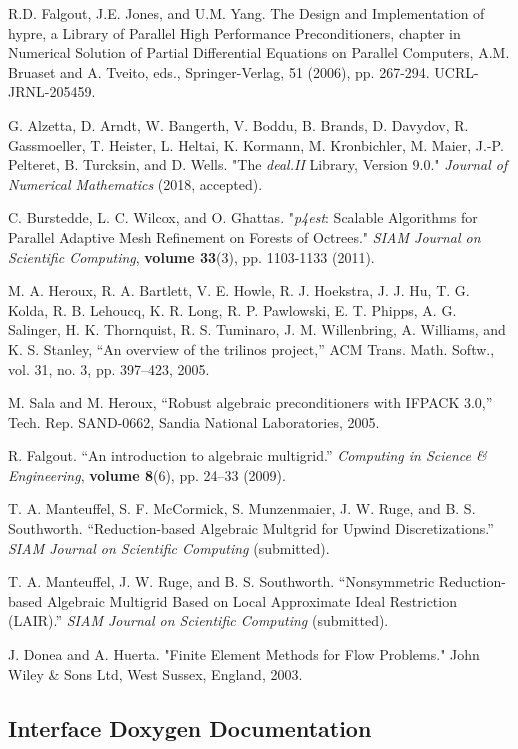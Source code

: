 \documentclass[11pt]{article}
\begin{document}
\FloatBarrier
\newpage
\begin{thebibliography}{9}

	R.D. Falgout, J.E. Jones, and U.M. Yang. 
	The Design and Implementation of hypre, a Library of Parallel High Performance Preconditioners, chapter in Numerical Solution of Partial Differential Equations on Parallel Computers, A.M. Bruaset and A. Tveito, eds., Springer-Verlag, 51 (2006), pp. 267-294. UCRL-JRNL-205459.
	
	G. Alzetta, D. Arndt, W. Bangerth, V. Boddu, B. Brands, D. Davydov, R. Gassmoeller, T. Heister, L. Heltai, K. Kormann, M. Kronbichler, M. Maier, J.-P. Pelteret, B. Turcksin, and D. Wells. "The \textit{deal.II} Library, Version 9.0." \textit{Journal of Numerical Mathematics} (2018, accepted).	
	
	C. Burstedde, L. C. Wilcox, and O. Ghattas. 
    "\textit{p4est}: Scalable Algorithms for Parallel Adaptive Mesh Refinement on Forests of Octrees." \textit{SIAM Journal on Scientific Computing}, \textbf{volume 33}(3), pp. 1103-1133 (2011).
    
	M. A. Heroux, R. A. Bartlett, V. E. Howle, R. J. Hoekstra, J. J. Hu, T. G. Kolda, R. B. Lehoucq, K. R. Long, R. P. Pawlowski, E. T. Phipps, A. G. Salinger, H. K. Thornquist, R. S. Tuminaro, J. M. Willenbring, A. Williams, and K. S. Stanley, “An overview of the trilinos project,” ACM Trans. Math. Softw., vol. 31, no. 3, pp. 397–423, 2005.
	
	M. Sala and M. Heroux, “Robust algebraic preconditioners with IFPACK 3.0,” Tech. Rep. SAND-0662, Sandia National Laboratories, 2005.
	
	R. Falgout. “An introduction to algebraic multigrid.” \textit{Computing in Science \& Engineering}, \textbf{volume 8}(6), pp. 24–33 (2009).
	
	T. A. Manteuffel, S. F. McCormick, S. Munzenmaier, J. W. Ruge, and B. S. Southworth. “Reduction-based Algebraic Multgrid for Upwind Discretizations.” \textit{SIAM Journal on Scientific Computing} (submitted).
	
	T. A. Manteuffel, J. W. Ruge, and B. S. Southworth. “Nonsymmetric Reduction-based Algebraic Multigrid Based on Local Approximate Ideal Restriction (LAIR).” \textit{SIAM Journal on Scientific Computing} (submitted).
	
	J. Donea and A. Huerta. "Finite Element Methods for Flow Problems." John Wiley \& Sons Ltd, West Sussex, England, 2003.
	
\end{thebibliography}

\newpage
\begin{appendices}
	\chapter{Interface Doxygen Documentation}

\end{appendices}
\end{document}
